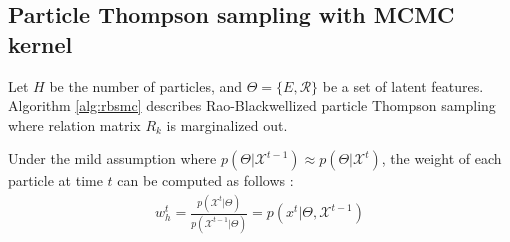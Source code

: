 \subsection{Particle Thompson sampling with MCMC kernel}
Let $H$ be the number of particles, and $\Theta= \{E, \mathcal{R}\}$ be a set of latent features.
Algorithm \ref{alg:rbsmc} describes Rao-Blackwellized particle Thompson sampling where relation matrix $R_k$ is marginalized out.

Under the mild assumption where $p(\Theta | \mathcal{X}^{t-1}) \approx p(\Theta | \mathcal{X}^{t})$, the weight of each particle at time $t$ can be computed as follows \cite{del2006sequential,chopin2002sequential}:
\begin{align}
w_{h}^{t} = \frac{p(\mathcal{X}^{t} | \Theta)}{p(\mathcal{X}^{t-1} | \Theta)} = p(x^{t} | \Theta, \mathcal{X}^{t-1})
\end{align}


%

%
%
%

